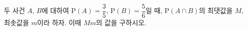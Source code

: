 두 사건 $A$, $B$에 대하여 $\mathrm{P}(A)=\dfrac{3}{5}$, $\mathrm{P}(B)=\dfrac{5}{6}$일 때, $\mathrm{P}(A\cap B)$의 최댓값을 $M$, 최솟값을 $m$이라 하자. 이때 $Mm$의 값을 구하시오.
